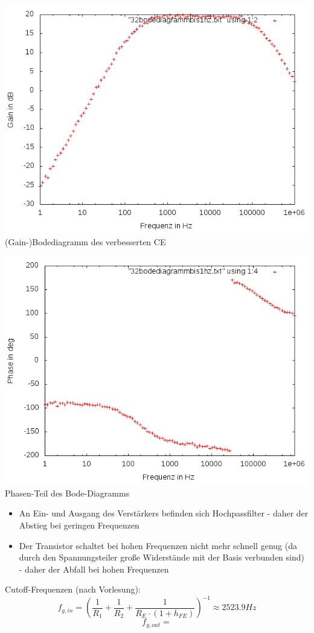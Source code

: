\documentclass[compress,11pt]{beamer}
\begin{document}
\begin{frame}
\includegraphics[width=.7\textwidth]{../daten/messungen/3aufgabe/32bodegain}\\
(Gain-)Bodediagramm des verbesserten CE\\
\tiny 
\end{frame}
\begin{frame}

\includegraphics[width=.7\textwidth]{../daten/messungen/3aufgabe/32bodephase}\\
Phasen-Teil des Bode-Diagramms
\end{frame}
\begin{frame}
\begin{itemize}

\item An Ein- und Ausgang des Verstärkers befinden sich Hochpassfilter - daher der Abstieg bei geringen Frequenzen
\item Der Transistor schaltet bei hohen Frequenzen nicht mehr schnell genug (da durch den Spannungsteiler große Widerstände mit der Basis verbunden sind) - daher der Abfall bei hohen Frequenzen

\end{itemize}
Cutoff-Frequenzen (nach Vorlesung):
\begin{equation}
f_{g,in} = (\frac{1}{R_1} + \frac{1}{R_2} + \frac{1}{R_E \cdot (1 + h_{FE})})^{-1} \approx 2523.9 Hz
\end{equation}
\begin{equation}
f_{g,out} = 
\end{equation}
\end{frame}
\end{document}
